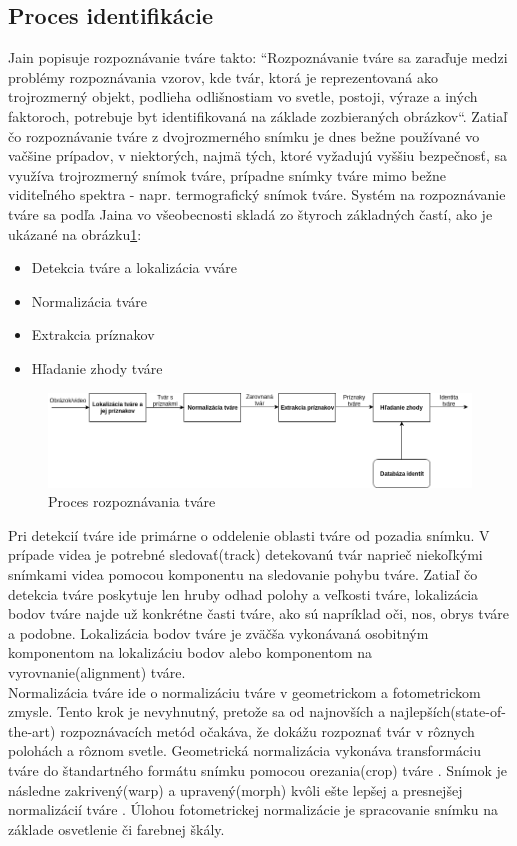\subsection{Proces identifikácie}
Jain popisuje rozpoznávanie tváre takto: ``Rozpoznávanie tváre sa zaraďuje medzi problémy rozpoznávania vzorov, kde tvár, ktorá je reprezentovaná ako trojrozmerný objekt,
podlieha odlišnostiam vo svetle, postoji, výraze a iných faktoroch, potrebuje byt identifikovaná na základe zozbieraných obrázkov``\cite{handbookface}.
Zatiaľ čo rozpoznávanie tváre z dvojrozmerného snímku je dnes bežne používané vo vačšine prípadov, v niektorých, najmä tých, ktoré vyžadujú vyššiu bezpečnosť,
sa využíva trojrozmerný snímok tváre,
prípadne snímky tváre mimo bežne viditeľného spektra - napr. termografický snímok tváre.  Systém na rozpoznávanie tváre sa podľa Jaina\cite{handbookface} vo všeobecnosti skladá zo štyroch
základných častí, ako je ukázané na obrázku\ref{fig:workflow}:

\begin{itemize}
	\item Detekcia tváre a lokalizácia vváre
	\item Normalizácia tváre
	\item Extrakcia príznakov
	\item Hľadanie zhody tváre
\end{itemize}

\begin{figure}[H]
	\centering
	\includegraphics[width=1\linewidth]{img/workflow}
	\caption{Proces rozpoznávania tváre}
	\label{fig:workflow}
\end{figure}

\indent  Pri detekcií tváre ide primárne o oddelenie oblasti tváre od pozadia snímku.
V prípade videa je potrebné sledovať(track) detekovanú tvár naprieč niekoľkými snímkami videa pomocou komponentu na sledovanie pohybu tváre.
Zatiaľ čo detekcia tváre poskytuje len hruby odhad polohy a veľkosti tváre, lokalizácia bodov tváre najde už konkrétne časti tváre,
ako sú napríklad oči, nos, obrys tváre a podobne.
Lokalizácia bodov tváre je zväčša vykonávaná osobitným komponentom na lokalizáciu bodov alebo komponentom na vyrovnanie(alignment) tváre.\\
Normalizácia tváre ide o normalizáciu tváre v geometrickom a fotometrickom zmysle.
Tento krok je nevyhnutný, pretože sa od najnovších a najlepších(state-of-the-art) rozpoznávacích metód očakáva, že dokážu rozpoznať tvár v rôznych polohách a rôznom svetle.
Geometrická normalizácia vykonáva transformáciu tváre do štandartného formátu snímku pomocou orezania(crop) tváre \cite{handbookface}.
Snímok je následne zakrivený(warp) a upravený(morph) kvôli ešte lepšej a presnejšej normalizácií tváre \cite{handbookface}.
Úlohou fotometrickej normalizácie je spracovanie snímku na základe osvetlenie či farebnej škály.\\


